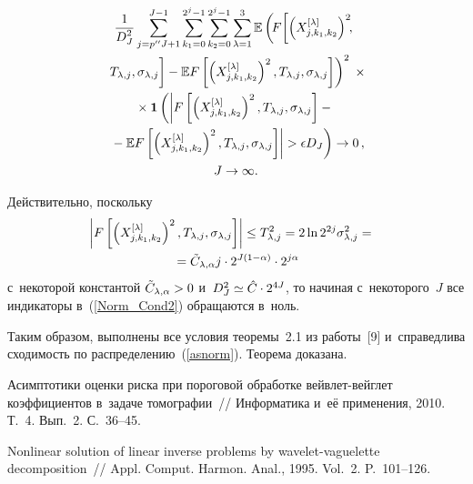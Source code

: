 \begin{multicols}{2}
\noindent
\begin{multline}
\label{Norm_Cond2}
\fr{1}{D^2_J} \sum\limits_{j = p''J + 1}^{J - 1}
\sum\limits_{k_1=0}^{2^j - 1}\sum\limits_{k_2=0}^{2^j - 1}
\sum\limits_{\lambda = 1}^{3} \Expect
\left( \!F\!\left[\left(X_{j,k_1,k_2}^{[\lambda]}\right)^2\!\!,\right.\right.\\
\left.\left.T_{\lambda,j},\sigma_{\lambda,j}
\vphantom{\left(X_{j,k_1,k_2}^{[\lambda]}\right)^2}
\right] -\Expect F\left[\left(X_{j,k_1,k_2}^{[\lambda]}\right)^2,
T_{\lambda,j},\sigma_{\lambda,j}\right]\right)^2\;\times\\
{}\times\mathbf{1}
\left( \left\vert F\left[\left(X_{j,k_1,k_2}^{[\lambda]}\right)^2,
T_{\lambda,j},\sigma_{\lambda,j}\right] -{}\right.\right.\\
\left.\left.{}-
\Expect  F\left[\left(X_{j,k_1,k_2}^{[\lambda]}\right)^2,T_{\lambda,j},\sigma_{\lambda,j}\right]\right\vert
> \epsilon D_J\right) \rightarrow 0\,,\\ J\rightarrow\infty.
\end{multline}


Действительно, поскольку
\begin{multline*}
\hspace*{-6pt}\left\vert F\left[\left(X_{j,k_1,k_2}^{[\lambda]}\right)^2,
T_{\lambda,j},\sigma_{\lambda,j}\right]\right\vert
\leq T_{\lambda,j}^2 =2\ln2^{2j}\sigma^2_{\lambda,j}
= {}\\
{}=\tilde{C}_{\lambda,\alpha} j\cdot 2^{J(1-\alpha)}\cdot 2^{j\alpha}
\end{multline*}
с~некоторой константой $\tilde{C}_{\lambda,\alpha}\hm>0$
и~$D_J^2 \hm\simeq \hat{C} \cdot2^{4J}$, то начиная с~некоторого~$J$ все
индикаторы в~(\ref{Norm_Cond2}) обращаются в~ноль.

Таким образом, выполнены все условия теоремы~2.1 из работы~[9]
и~справедлива сходимость по распределению~(\ref{asnorm}). Теорема доказана.



{\small\frenchspacing
 {%
 \begin{thebibliography}{9}


 Асимптотики оценки риска
при пороговой обработке вейв\-лет-вейг\-лет коэффициентов в~задаче
томографии~// Информатика и~её применения, 2010. Т.~4. Вып.~2.
С.~36--45.

 Nonlinear solution of linear inverse problems
by wavelet-vaguelette decomposition~// Appl. Comput.
Harmon. Anal., 1995. Vol.~2. P.~101--126.


\end{thebibliography}}}
\end{multicols}
